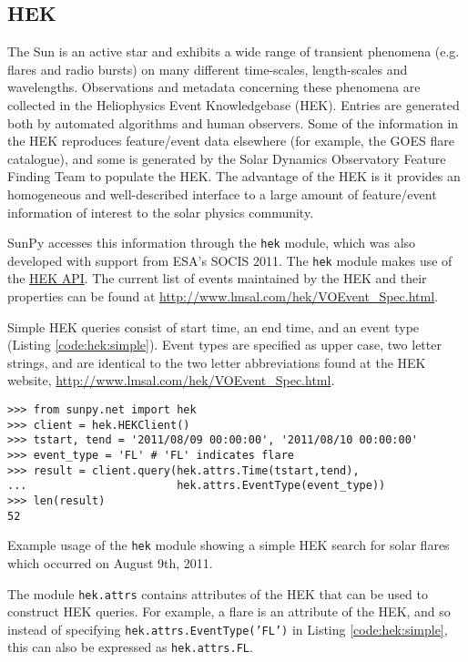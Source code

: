\subsection{HEK}\label{ssec:hek}

The Sun is an active star and exhibits a wide range of transient phenomena 
(e.g. flares and radio bursts) on many different time-scales, length-scales and 
wavelengths. Observations and metadata concerning these phenomena are collected 
in the Heliophysics Event Knowledgebase (HEK).  Entries are generated both by 
automated algorithms and human observers.  Some of the information in the HEK 
reproduces feature/event data elsewhere (for example, the GOES flare catalogue),
and some is generated by the Solar Dynamics Observatory Feature Finding Team 
\citep{martens2012} to populate the HEK.  The advantage of the HEK is it 
provides an homogeneous and well-described interface to a large amount of 
feature/event information of interest to the solar physics community.

SunPy accesses this information through the \texttt{hek} module, which was also
developed with support from ESA's SOCIS 2011.  The \texttt{hek} module makes 
use of the 
\href{http://vso.stanford.edu/hekwiki/ApplicationProgrammingInterface?action=print}{HEK
 API}.
The current list of events maintained by the HEK and their properties can be 
found at \url{http://www.lmsal.com/hek/VOEvent_Spec.html}.

Simple HEK queries consist of start time, an end time, and an event type 
(Listing \ref{code:hek:simple}). Event types are specified as upper case, 
two letter strings, and are 
identical to the two letter abbreviations found at the HEK website, 
\url{http://www.lmsal.com/hek/VOEvent_Spec.html}.

\begin{listing}[H]
\begin{verbatim}
>>> from sunpy.net import hek
>>> client = hek.HEKClient()
>>> tstart, tend = '2011/08/09 00:00:00', '2011/08/10 00:00:00'
>>> event_type = 'FL' # 'FL' indicates flare
>>> result = client.query(hek.attrs.Time(tstart,tend), 
...                       hek.attrs.EventType(event_type))
>>> len(result)
52
\end{verbatim}
\caption{Example usage of the \texttt{hek} module showing a simple HEK search for solar flares
which occurred on August 9th, 2011.}
\label{code:hek:simple}
\end{listing}

The module \texttt{hek.attrs} contains attributes of the HEK that can be used to
construct HEK queries.  For example, a flare is an attribute of the HEK, and so 
instead of specifying \texttt{hek.attrs.EventType('FL')} in Listing 
\ref{code:hek:simple}, this can also be expressed as \texttt{hek.attrs.FL}. 

